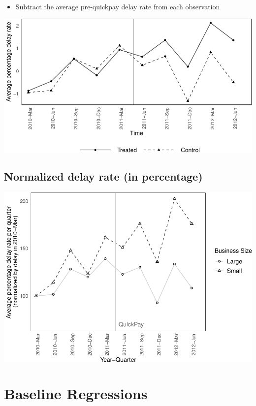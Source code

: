 \documentclass[
]{article}
\providecommand{\tightlist}{%
  \setlength{\itemsep}{0pt}\setlength{\parskip}{0pt}}
\begin{document}
\begin{itemize}
\tightlist
\item
  Subtract the average pre-quickpay delay rate from each observation
\end{itemize}

\includegraphics{qp_first_pc_delay-2_files/figure-latex/demeaned_plot-1.pdf}

\hypertarget{normalized-delay-rate-in-percentage}{%
\subsection{Normalized delay rate (in
percentage)}\label{normalized-delay-rate-in-percentage}}

\includegraphics{qp_first_pc_delay-2_files/figure-latex/normalized_plot-1.pdf}

\hypertarget{baseline-regressions}{%
\section{Baseline Regressions}\label{baseline-regressions}}
\end{document}
